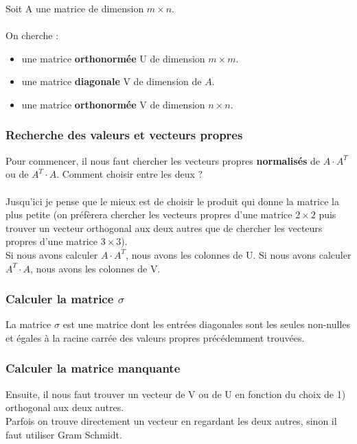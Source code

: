 \documentclass{article}
\begin{document}
Soit A une matrice de dimension $ m \times n $.\\\\
On cherche :
\begin{itemize}
    \item une matrice \textbf{orthonormée} U de dimension $ m \times m $.
    \item une matrice \textbf{diagonale} V de dimension de $ A $.
    \item une matrice \textbf{orthonormée} V de dimension $ n \times n $.
\end{itemize}

\subsubsection{Recherche des valeurs et vecteurs propres}

Pour commencer, il nous faut chercher les vecteurs propres \textbf{normalisés} de $ A \cdot A^T $ ou de $ A^T \cdot A $. Comment choisir entre les deux ?\\\\
Jusqu'ici je pense que le mieux est de choisir le produit qui donne la matrice la plus petite (on préfèrera chercher les vecteurs propres d'une matrice $ 2\times2 $ puis trouver un vecteur orthogonal aux deux autres que de chercher les vecteurs propres d'une matrice $ 3\times 3$).\\
Si nous avons calculer $ A \cdot A^T $, nous avons les colonnes de U.
Si nous avons calculer $ A^T \cdot A $, nous avons les colonnes de V.

\subsubsection{Calculer la matrice $ \sigma $}

La matrice $ \sigma $ est une matrice dont les entrées diagonales sont les seules non-nulles et égales à la racine carrée des valeurs propres précédemment trouvées.

\subsubsection{Calculer la matrice manquante}

Ensuite, il nous faut trouver un vecteur de V ou de U en fonction du choix de 1) orthogonal aux deux autres.\\
Parfois on trouve directement un vecteur en regardant les deux autres, sinon il faut utiliser Gram Schmidt.
\end{document}
